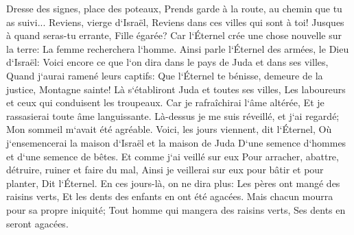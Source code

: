 \verse Dresse des signes, place des poteaux, Prends garde à la route, au chemin que tu as suivi... Reviens, vierge d`Israël, Reviens dans ces villes qui sont à toi! 
\verse Jusques à quand seras-tu errante, Fille égarée? Car l`Éternel crée une chose nouvelle sur la terre: La femme recherchera l`homme. 
\verse Ainsi parle l`Éternel des armées, le Dieu d`Israël: Voici encore ce que l`on dira dans le pays de Juda et dans ses villes, Quand j`aurai ramené leurs captifs: Que l`Éternel te bénisse, demeure de la justice, Montagne sainte! 
\verse Là s`établiront Juda et toutes ses villes, Les laboureurs et ceux qui conduisent les troupeaux. 
\verse Car je rafraîchirai l`âme altérée, Et je rassasierai toute âme languissante. 
\verse Là-dessus je me suis réveillé, et j`ai regardé; Mon sommeil m`avait été agréable. 
\verse Voici, les jours viennent, dit l`Éternel, Où j`ensemencerai la maison d`Israël et la maison de Juda D`une semence d`hommes et d`une semence de bêtes. 
\verse Et comme j`ai veillé sur eux Pour arracher, abattre, détruire, ruiner et faire du mal, Ainsi je veillerai sur eux pour bâtir et pour planter, Dit l`Éternel. 
\verse En ces jours-là, on ne dira plus: Les pères ont mangé des raisins verts, Et les dents des enfants en ont été agacées. 
\verse Mais chacun mourra pour sa propre iniquité; Tout homme qui mangera des raisins verts, Ses dents en seront agacées. 
